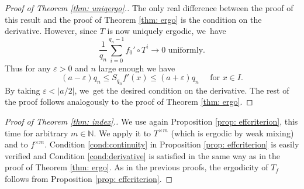\documentclass[JEP,XML,SOM,Unicode,NoEqCountersInSection,NoFloatCountersInSection,published]{cedram}
\theoremstyle{plain}
\theoremstyle{definition}
\newcommand{\N}{\mathbb{N}}
\begin{document}
\begin{proof}[Proof of Theorem \ref{thm: uniqergo}.]
The only real difference between the proof of this result and the proof of Theorem \ref{thm: ergo} is the condition on the derivative. However, since $T$ is now uniquely ergodic, we~have
\[
\frac{1}{q_n}\sum_{i=0}^{q_n-1}f_0'\circ T^i\to 0 \text{ uniformly.}
\]
Thus for any $\varepsilon>0$ and $n$ large enough we have
\[
(a-\varepsilon)q_n \le S_{q_n} f' (x)\le (a+\varepsilon)q_n \quad \text{ for }x\in I.
\]
By taking $\varepsilon<|a/2|$, we~get the desired condition on the derivative. The rest of the proof follows analogously to the proof of Theorem \ref{thm: ergo}.
\end{proof}

\begin{proof}[Proof of Theorem \ref{thm: index}.] We use again Proposition \ref{prop: effcriterion}, this time for arbitrary $m\in\N$. We apply it to $T^{\times m}$ (which is ergodic by weak mixing) and to $f^{\times m}$. Condition \eqref{cond:continuity} in Proposition \ref{prop: effcriterion} is easily verified and Condition \eqref{cond:derivative} is satisfied in the same way as in the proof of Theorem \ref{thm: ergo}. As in the previous proofs, the ergodicity of $T_f$ follows from Proposition \ref{prop: effcriterion}.
\end{proof}

\backmatter


\end{document}
